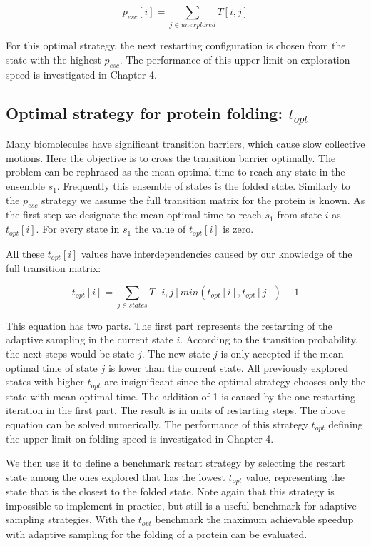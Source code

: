 $$p_{esc}[i]=\sum_{j \in unexplored}T[i, j]$$

For this optimal strategy, the next restarting configuration is chosen from the state with the highest $p_{esc}$. The performance of this upper limit on exploration speed is investigated in Chapter 4.

\subsection{Optimal strategy for protein folding: $t_{opt}$} 

Many biomolecules have significant transition barriers, which cause slow collective motions. Here the objective is to cross the transition barrier optimally.
The problem can be rephrased as the mean optimal time to reach any state in the ensemble  $s_1$. Frequently this ensemble of states is the folded state.  
Similarly to the $p_{esc}$ strategy we assume the full transition matrix for the protein is known. As the first step we designate the mean optimal time to reach $s_1$ from state $i$ as $t_{opt}[i]$.
For every state in $s_1$ the value of  $t_{opt}[i]$ is zero.

All these $t_{opt}[i]$ values have interdependencies caused by our knowledge of the full transition matrix:

$$t_{opt}[i]=\sum_{j \in states}T[i,j]min(t_{opt}[i],t_{opt}[j])+1$$

This equation has two parts. The first part represents the restarting of the adaptive sampling in the current state $i$. According to the transition probability, the next steps would be state $j$. The new state $j$ is only accepted if the mean optimal time of state $j$ is lower than the current state. All previously explored states with higher $t_{opt}$ are insignificant since the optimal strategy chooses only the state with mean optimal time. The addition of 1 is caused by the one restarting iteration in the first part. The result is in units of restarting steps. The above equation can be solved numerically. The performance of this strategy $t_{opt}$ defining the upper limit on folding speed is investigated in Chapter 4.

We then use it to define a benchmark restart strategy by
selecting the restart state among the ones explored that has the lowest
$t_{opt}$ value, representing the state that is the closest to the folded
state. Note again that this strategy is impossible to implement in
practice, but still is a useful benchmark for adaptive sampling strategies.
With the $t_{opt}$ benchmark the maximum achievable speedup with adaptive
sampling for the folding of a protein can be evaluated.


